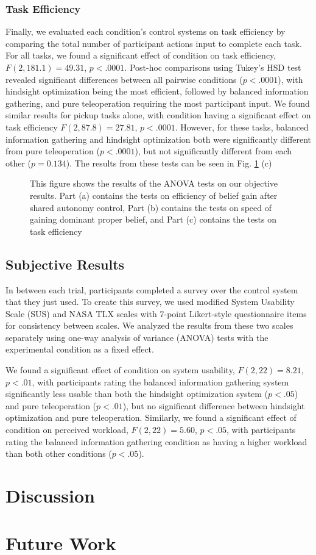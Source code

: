 \documentclass[conference]{IEEEtran}
\begin{document}
\subsubsection{Task Efficiency}

Finally, we evaluated each condition's control systems on task efficiency by comparing the total number of participant actions input to complete each task. For all tasks, we found a significant effect of condition on task efficiency, $F(2, 181.1) = 49.31$, $p < .0001$. Post-hoc comparisons using Tukey's HSD test revealed significant differences between all pairwise conditions ($p < .0001$), with hindsight optimization being the most efficient, followed by balanced information gathering, and pure teleoperation requiring the most participant input. We found similar results for pickup tasks alone, with condition having a significant effect on task efficiency $F(2, 87.8) = 27.81$, $p < .0001$. However, for these tasks, balanced information gathering and hindsight optimization both were significantly different from pure teleoperation ($p < .0001$), but not significantly different from each other ($p = 0.134$). The results from these tests can be seen in Fig. \ref{objective_results} (c)

\begin{figure*}
\caption{This figure shows the results of the ANOVA tests on our objective results. Part (a) contains the tests on efficiency of belief gain after shared autonomy control, Part (b) contains the tests on speed of gaining dominant proper belief, and Part (c) contains the tests on task efficiency}
\label{objective_results}
\end{figure*}

\subsection{Subjective Results}

In between each trial, participants completed a survey over the control system that they just used. To create this survey, we used modified System Usability Scale (SUS) and NASA TLX scales with 7-point Likert-style questionnaire items for consistency between scales. We analyzed the results from these two scales separately using one-way analysis of variance (ANOVA) tests with the experimental condition as a fixed effect.

We found a significant effect of condition on system usability, $F(2, 22) = 8.21$, $p < .01$, with participants rating the balanced information gathering system significantly less usable than both the hindsight optimization system ($p < .05$) and pure teleoperation ($p < .01$), but no significant difference between hindsight optimization and pure teleoperation. Similarly, we found a significant effect of condition on perceived workload, $F(2, 22) = 5.60$, $p < .05$, with participants rating the balanced information gathering condition as having a higher workload than both other conditions ($p < .05$).

\section{Discussion}


\section{Future Work}



\end{document}
